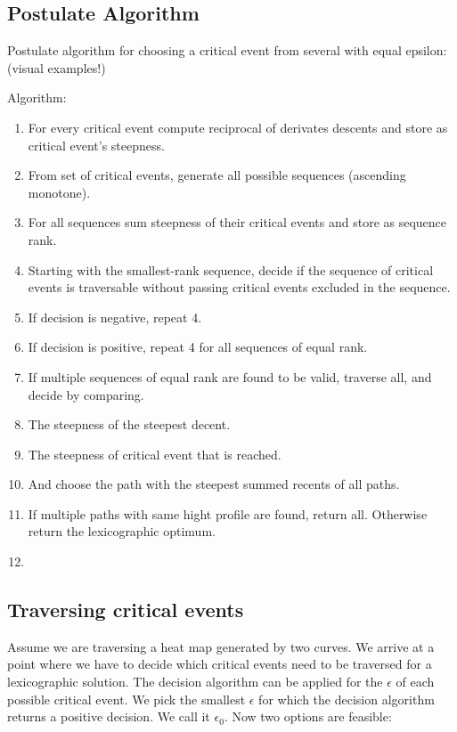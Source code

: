 \subsection{Postulate Algorithm}
Postulate algorithm for choosing a critical event from several with equal epsilon: (visual examples!)

Algorithm:
\begin{enumerate}
	\item For every critical event compute reciprocal of derivates descents and store as critical event's steepness.
	\item From set of critical events, generate all possible sequences (ascending monotone).
	\item For all sequences sum steepness of their critical events and store as sequence rank.
	\item Starting with the smallest-rank sequence, decide if the sequence of critical events is traversable without passing critical events excluded in the sequence.
	\item If decision is negative, repeat 4.
	\item If decision is positive, repeat 4 for all sequences of equal rank.
	\item If multiple sequences of equal rank are found to be valid, traverse all, and decide by comparing.
	\item The steepness of the steepest decent.
	\item The steepness of critical event that is reached.
	\item And choose the path with the steepest summed recents of all paths.
	\item If multiple paths with same hight profile are found, return all. Otherwise return the lexicographic optimum.
	\item 
\end{enumerate}

\subsection{Traversing critical events}

Assume we are traversing a heat map generated by two curves. We arrive at a point where we have to decide which critical events need to be traversed for a lexicographic solution. The decision algorithm\cite{altgodau} can be applied for the $\epsilon$ of each possible critical event. We pick the smallest $\epsilon$ for which the decision algorithm returns a positive decision. We call it $\epsilon_0$. Now two options are feasible:

